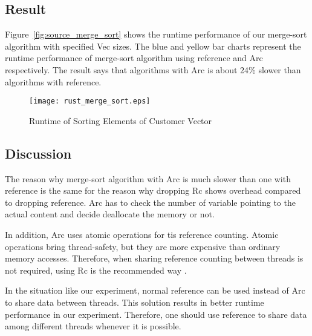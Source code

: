 \subsection{Result}
Figure~\ref{fig:source_merge_sort} shows the runtime performance of our merge-sort algorithm with specified Vec sizes. 
The blue and yellow bar charts represent the runtime performance of merge-sort algorithm using reference and Arc respectively. 
The result says that algorithms with Arc is about 24\% slower than algorithms with reference.

\begin{figure}[htb]
    \texttt{[image: rust\_merge\_sort.eps]}
    \caption{Runtime of Sorting Elements of Customer Vector}
    \label{fig:merge_sort}
\end{figure}

\subsection{Discussion}
The reason why merge-sort algorithm with Arc is much slower than one with reference is 
the same for the reason why dropping Rc shows overhead compared to dropping reference.
Arc has to check the number of variable pointing to the actual content and decide 
deallocate the memory or not.

In addition, Arc uses atomic operations for tis reference counting. Atomic operations bring thread-safety, but they are more expensive than ordinary memory accesses.
Therefore, when sharing reference counting between threads is not required, using Rc is the recommended way \cite{RustArcPage}.

In the situation like our experiment, normal reference can be used instead of Arc to share data between threads. 
This solution results in better runtime performance in our experiment. Therefore, one should use reference to share data among different threads 
whenever it is possible.

